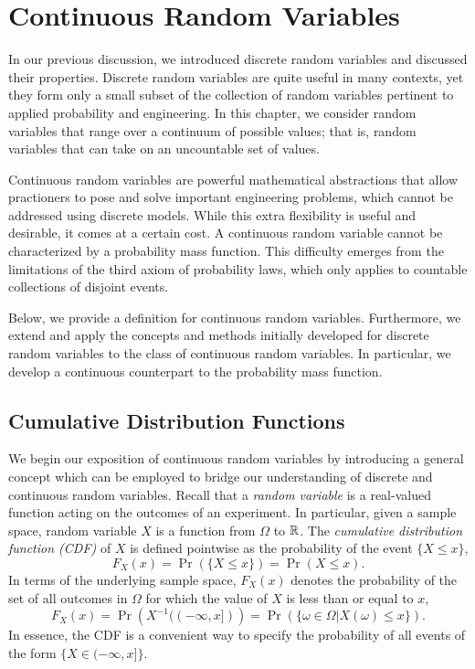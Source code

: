 \chapter{Continuous Random Variables}

In our previous discussion, we introduced discrete random variables and discussed their properties.
Discrete random variables are quite useful in many contexts, yet they form only a small subset of the collection of random variables pertinent to applied probability and engineering.
In this chapter, we consider random variables that range over a continuum of possible values; that is, random variables that can take on an uncountable set of values.

Continuous random variables are powerful mathematical abstractions that allow practioners to pose and solve important engineering problems, which cannot be addressed using discrete models.
While this extra flexibility is useful and desirable, it comes at a certain cost.
A continuous random variable cannot be characterized by a probability mass function.
This difficulty emerges from the limitations of the third axiom of probability laws, which only applies to countable collections of disjoint events.

Below, we provide a definition for continuous random variables.
Furthermore, we extend and apply the concepts and methods initially developed for discrete random variables to the class of continuous random variables.
In particular, we develop a continuous counterpart to the probability mass function.


\section{Cumulative Distribution Functions}

We begin our exposition of continuous random variables by introducing a general concept which can be employed to bridge our understanding of discrete and continuous random variables.
Recall that a \emph{random variable} is a real-valued function acting on the outcomes of an experiment. 
In particular, given a sample space, random variable $X$ is a function from $\Omega$ to $\mathbb{R}$.
The \emph{cumulative distribution function (CDF)} of $X$ is defined pointwise as the probability of the event $\{X \leq x \}$, 
\begin{equation*}
F_X (x) = \Pr ( \{ X \leq x \} ) = \Pr (X \leq x).
\end{equation*}
In terms of the underlying sample space, $F_X (x)$ denotes the probability of the set of all outcomes in $\Omega$ for which the value of $X$ is less than or equal to $x$,
\begin{equation*}
F_X (x) = \Pr \left( X^{-1} ( (- \infty, x]) \right)
= \Pr (\{ \omega \in \Omega | X(\omega) \leq x \}).
\end{equation*}
In essence, the CDF is a convenient way to specify the probability of all events of the form $\{ X \in (-\infty, x] \}$.

